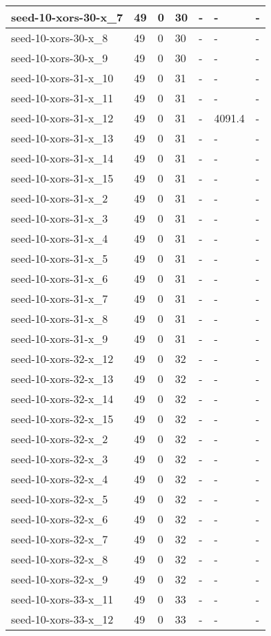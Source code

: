 \begin{scriptsize}
\begin{longtable}{|p{5cm}|l|l|l|l|l|l|}
seed-10-xors-30-x\_7&49&0&30&-&-&- \\ \hline 
seed-10-xors-30-x\_8&49&0&30&-&-&- \\ \hline 
seed-10-xors-30-x\_9&49&0&30&-&-&- \\ \hline 
seed-10-xors-31-x\_10&49&0&31&-&-&- \\ \hline 
seed-10-xors-31-x\_11&49&0&31&-&-&- \\ \hline 
seed-10-xors-31-x\_12&49&0&31&-&4091.4&- \\ \hline 
seed-10-xors-31-x\_13&49&0&31&-&-&- \\ \hline 
seed-10-xors-31-x\_14&49&0&31&-&-&- \\ \hline 
seed-10-xors-31-x\_15&49&0&31&-&-&- \\ \hline 
seed-10-xors-31-x\_2&49&0&31&-&-&- \\ \hline 
seed-10-xors-31-x\_3&49&0&31&-&-&- \\ \hline 
seed-10-xors-31-x\_4&49&0&31&-&-&- \\ \hline 
seed-10-xors-31-x\_5&49&0&31&-&-&- \\ \hline 
seed-10-xors-31-x\_6&49&0&31&-&-&- \\ \hline 
seed-10-xors-31-x\_7&49&0&31&-&-&- \\ \hline 
seed-10-xors-31-x\_8&49&0&31&-&-&- \\ \hline 
seed-10-xors-31-x\_9&49&0&31&-&-&- \\ \hline 
seed-10-xors-32-x\_12&49&0&32&-&-&- \\ \hline 
seed-10-xors-32-x\_13&49&0&32&-&-&- \\ \hline 
seed-10-xors-32-x\_14&49&0&32&-&-&- \\ \hline 
seed-10-xors-32-x\_15&49&0&32&-&-&- \\ \hline 
seed-10-xors-32-x\_2&49&0&32&-&-&- \\ \hline 
seed-10-xors-32-x\_3&49&0&32&-&-&- \\ \hline 
seed-10-xors-32-x\_4&49&0&32&-&-&- \\ \hline 
seed-10-xors-32-x\_5&49&0&32&-&-&- \\ \hline 
seed-10-xors-32-x\_6&49&0&32&-&-&- \\ \hline 
seed-10-xors-32-x\_7&49&0&32&-&-&- \\ \hline 
seed-10-xors-32-x\_8&49&0&32&-&-&- \\ \hline 
seed-10-xors-32-x\_9&49&0&32&-&-&- \\ \hline 
seed-10-xors-33-x\_11&49&0&33&-&-&- \\ \hline 
seed-10-xors-33-x\_12&49&0&33&-&-&- \\ \hline 

\end{longtable}
\end{scriptsize}
